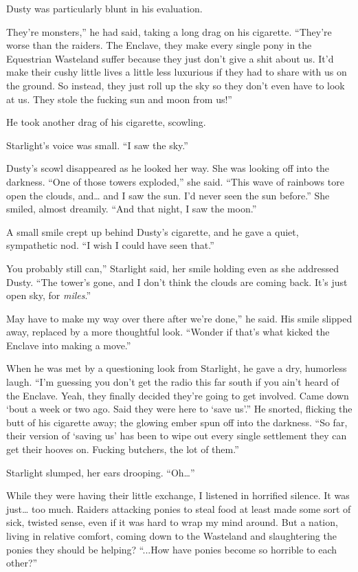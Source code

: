 Dusty was particularly blunt in his evaluation.

\leavevmode{}They’re monsters,” he had said, taking a long drag on his cigarette. “They’re worse than the raiders. The Enclave, they make every single pony in the Equestrian Wasteland suffer because they just don’t give a shit about us. It’d make their cushy little lives a little less luxurious if they had to share with us on the ground. So instead, they just roll up the sky so they don’t even have to look at us. They stole the fucking sun and moon from us!”

He took another drag of his cigarette, scowling.

Starlight’s voice was small. “I saw the sky.”

Dusty’s scowl disappeared as he looked her way. She was looking off into the darkness. “One of those towers exploded,” she said. “This wave of rainbows tore open the clouds, and… and I saw the sun. I’d never seen the sun before.” She smiled, almost dreamily. “And that night, I saw the moon.”

A small smile crept up behind Dusty’s cigarette, and he gave a quiet, sympathetic nod. “I wish I could have seen that.”

\leavevmode{}You probably still can,” Starlight said, her smile holding even as she addressed Dusty. “The tower’s gone, and I don’t think the clouds are coming back. It’s just open sky, for \textit{miles}.”

\leavevmode{}May have to make my way over there after we’re done,” he said. His smile slipped away, replaced by a more thoughtful look. “Wonder if that’s what kicked the Enclave into making a move.”

When he was met by a questioning look from Starlight, he gave a dry, humorless laugh. “I’m guessing you don’t get the radio this far south if you ain’t heard of the Enclave. Yeah, they finally decided they’re going to get involved. Came down ‘bout a week or two ago. Said they were here to ‘save us’.” He snorted, flicking the butt of his cigarette away; the glowing ember spun off into the darkness. “So far, their version of ‘saving us’ has been to wipe out every single settlement they can get their hooves on. Fucking butchers, the lot of them.”

Starlight slumped, her ears drooping. “Oh…”

While they were having their little exchange, I listened in horrified silence. It was just… too much. Raiders attacking ponies to steal food at least made some sort of sick, twisted sense, even if it was hard to wrap my mind around. But a nation, living in relative comfort, coming down to the Wasteland and slaughtering the ponies they should be helping? “...How have ponies become so horrible to each other?”


